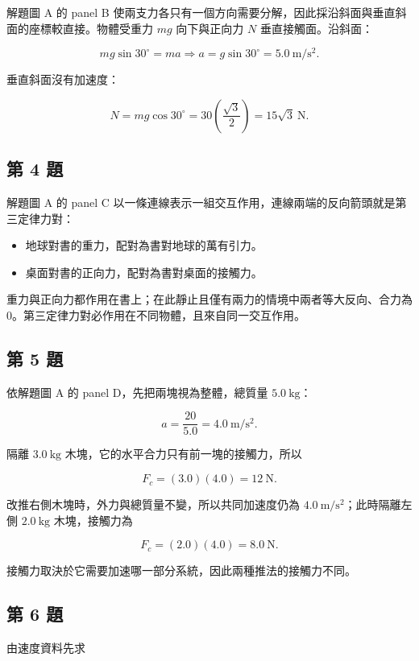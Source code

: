 \documentclass[11pt,a4paper]{article}
\providecommand{\tightlist}{%
  \setlength{\itemsep}{0pt}\setlength{\parskip}{0pt}}
\begin{document}
解題圖 A 的 panel B 使兩支力各只有一個方向需要分解，因此採沿斜面與垂直斜面的座標較直接。物體受重力 \(mg\) 向下與正向力 \(N\) 垂直接觸面。沿斜面：

\[
mg\sin30^\circ=ma
\Rightarrow a=g\sin30^\circ=5.0\ \mathrm{m/s^2}.
\]

垂直斜面沒有加速度：

\[
N=mg\cos30^\circ=30\left(\frac{\sqrt3}{2}\right)=15\sqrt3\ \mathrm N.
\]

\subsection{第 4 題}\label{ux7b2c-4-ux984c}

解題圖 A 的 panel C 以一條連線表示一組交互作用，連線兩端的反向箭頭就是第三定律力對：

\begin{itemize}
\tightlist
\item
  地球對書的重力，配對為書對地球的萬有引力。
\item
  桌面對書的正向力，配對為書對桌面的接觸力。
\end{itemize}

重力與正向力都作用在書上；在此靜止且僅有兩力的情境中兩者等大反向、合力為 0。第三定律力對必作用在不同物體，且來自同一交互作用。

\subsection{第 5 題}\label{ux7b2c-5-ux984c}

依解題圖 A 的 panel D，先把兩塊視為整體，總質量 \(5.0\ \mathrm{kg}\)：

\[
a=\frac{20}{5.0}=4.0\ \mathrm{m/s^2}.
\]

隔離 \(3.0\ \mathrm{kg}\) 木塊，它的水平合力只有前一塊的接觸力，所以

\[
F_c=(3.0)(4.0)=12\ \mathrm N.
\]

改推右側木塊時，外力與總質量不變，所以共同加速度仍為 \(4.0\ \mathrm{m/s^2}\)；此時隔離左側 \(2.0\ \mathrm{kg}\) 木塊，接觸力為

\[
F_c=(2.0)(4.0)=8.0\ \mathrm N.
\]

接觸力取決於它需要加速哪一部分系統，因此兩種推法的接觸力不同。

\subsection{第 6 題}\label{ux7b2c-6-ux984c}

由速度資料先求
\end{document}

